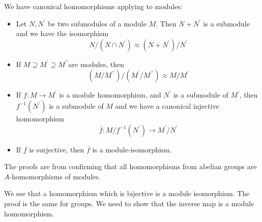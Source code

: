 \documentclass{report}
\begin{document}
We have canonical homomorphisms applying to modules:
    \begin{itemize}
        \item Let $N, N^{\prime}$ be two submodules of a module $M$. Then $N + N^{\prime}$ is a submodule and we have the isomorphism
            \begin{equation*}
                N/(N \cap N^{\prime}) \approx (N + N^{\prime})/N^{\prime}
            \end{equation*}

        \item If $M \supseteq M^{\prime} \supseteq M^{\prime\prime}$are modules, then 
            \begin{equation*}
                (M/M^{\prime\prime})/(M^{\prime}/M^{\prime\prime}) \approx M/M^{\prime}
            \end{equation*}

        \item If $f : M \rightarrow M^{\prime}$ is a module homomorphism, and $N^{\prime}$ is a submodule of $M^{\prime}$, then $f^{-1}(N^{\prime})$ is a submodule of $M$ and we have a canonical injective homomorphism
            \begin{equation*}
                \overline{f} : M/f^{-1}(N^{\prime}) \rightarrow M^{\prime}/N^{\prime}
            \end{equation*}

        \item If $f$ is surjective, then $\overline{f}$ is a module-isomorphism. 
    \end{itemize}
The proofs are from confirming that all homomorphisms from abelian groups are $A$-homomorphisms of modules.

We see that a homomorphism which is bijective is a module isomorphism. The proof is the same for groups. We need to show that the inverse map is a module homomorphism.
\end{document}
